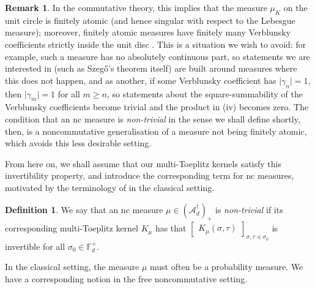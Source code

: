 \documentclass[11pt,reqno]{amsart}
\newcommand\ncm[1]{(\mathscr{A}_{#1}^{\dagger})_+}
\def\g{\gamma}
\def\s{\sigma}
\def\t{\tau}
\def\FF{\mathbb{F}}
\theoremstyle{definition}
\newtheorem{definition}[theorem]{Definition}
\newtheorem{remark}[theorem]{Remark}
\numberwithin{equation}{section}
\begin{document}
\begin{remark}
    In the commutative theory, this implies that the measure \(\mu_K\) on the unit circle is finitely atomic \cite[Theorem 11.3]{Sch17} (and hence singular with respect to the Lebesgue measure); moreover, finitely atomic measures have finitely many Verblunsky coefficients strictly inside the unit disc \cite[Section 1.3.6]{Sim05}. This is a situation we wish to avoid: for example, such a measure has no absolutely continuous part, so statements we are interested in (such as Szeg\H{o}'s theorem itself) are built around measures where this does not happen, and as another, if some Verblunsky coefficient has \(\lvert \g_n \rvert = 1 \), then \(\lvert \g_m \rvert = 1\) for all \(m \geq n\), so statements about the square-summability of the Verblunsky coefficients become trivial and the product in (iv) becomes zero. The condition that an nc measure is \emph{non-trivial} in the sense we shall define shortly, then, is a noncommutative generalisation of a measure not being finitely atomic, which avoids this less desirable setting.
\end{remark}

From here on, we shall assume that our multi-Toeplitz kernels satisfy this invertibility property, and introduce the corresponding term for nc measures, motivated by the terminology of \cite{Sim05} in the classical setting.

\begin{definition}
    We say that an nc measure \(\mu \in \ncm{d}\) is \emph{non-trivial} if its corresponding multi-Toeplitz kernel \(K_\mu\) has that \(\begin{bmatrix}K_\mu(\s,\t)\end{bmatrix}_{\s,\t \preceq \s_0}\) is invertible for all \(\s_0 \in \FF_d^+\).
\end{definition}

In the classical setting, the measure \(\mu\) must often be a probability measure. We have a corresponding notion in the free noncommutative setting.
\end{document}
